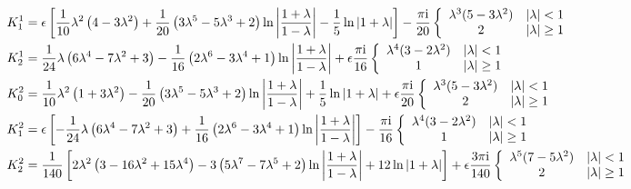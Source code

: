 \documentclass[a4paper,fleqn,usenatbib]{mnras}
\begin{document}
\begin{align}
&K_1^1 =  \epsilon \left[\frac{1}{10}\lambda^2\left( 4 - 3\lambda^2\right) + \frac{1}{20} \left(3 \lambda^5-5 \lambda^3+2\right)\ln\left|\frac{1+\lambda}{1-\lambda} \right| - \frac{1}{5}\ln\left|1+\lambda \right| \right]-  \frac{ \pi {\rm i}}{20}  \left\lbrace \begin{array}{cc}
  \lambda^3(5- 3 \lambda^2) &  |\lambda|< 1 \\
2 & |\lambda| \geq 1 
\end{array}\right.  \nonumber \\
&K_2^1= \frac{1}{24}\lambda\left(  6\lambda^4-7\lambda^2 +3 \right) - \frac{1}{16} \left(2 \lambda^6-3 \lambda^4 +1\right)\ln\left|\frac{1+\lambda}{1-\lambda} \right|  +  \epsilon\frac{ \pi {\rm i}}{16} \left\lbrace \begin{array}{cc}
  \lambda^4(3-2 \lambda^2) &  |\lambda| < 1 \\
1 &  |\lambda| \geq 1 
\end{array}\right.  \nonumber   
\\
&K_0^2 = \frac{1}{10}\lambda^2\left( 1+ 3\lambda^2\right) - \frac{1}{20} \left(3 \lambda^5-5 \lambda^3+2\right)\ln\left|\frac{1+\lambda}{1-\lambda} \right| + \frac{1}{5}\ln\left|1+\lambda \right| + \epsilon \frac{ \pi {\rm i}}{20}  \left\lbrace \begin{array}{cc}
  \lambda^3(5- 3 \lambda^2) &  |\lambda|< 1 \\
2 & |\lambda| \geq 1 
\end{array}\right.  \nonumber \\
&K_1^2 = \epsilon \left[-\frac{1}{24}\lambda\left(  6\lambda^4-7\lambda^2 +3 \right) + \frac{1}{16} \left(2 \lambda^6-3 \lambda^4 +1\right)\ln\left|\frac{1+\lambda}{1-\lambda} \right| \right] -\frac{ \pi {\rm i}}{16} \left\lbrace \begin{array}{cc}
  \lambda^4(3-2 \lambda^2) &  |\lambda| < 1 \\
1 &  |\lambda| \geq 1 
\end{array}\right.  \nonumber  \\
&K_2^2 =  \frac{1}{140} \left[2\lambda^2\left( 3 - 16\lambda^2+15 \lambda^4\right) -3 \left(5 \lambda^7-7 \lambda^5+2\right)\ln\left|\frac{1+\lambda}{1-\lambda} \right| +12\ln\left|1+\lambda \right| \right] +\epsilon  \frac{ 3 \pi {\rm i}}{140}  \left\lbrace \begin{array}{cc}
  \lambda^5(7- 5 \lambda^2) &  |\lambda|< 1 \\
2 & |\lambda| \geq 1 
\end{array}\right.  \nonumber
\end{align}
\end{document}
